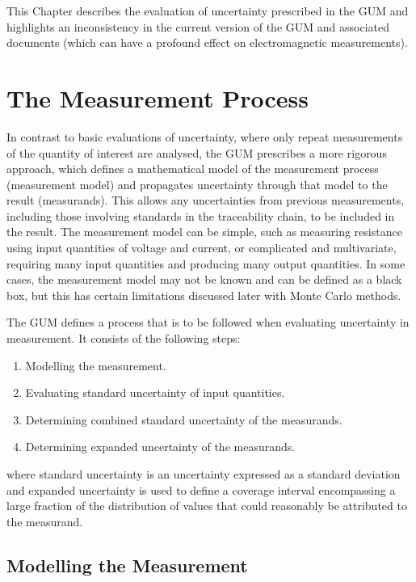 \documentclass[../thesis/thesis.tex]{subfiles}
\begin{document}
\begin{refsection}
This Chapter describes the evaluation of uncertainty prescribed in the GUM and highlights an inconsistency in the current version of the GUM and associated documents (which can have a profound effect on electromagnetic measurements).

\section{The Measurement Process}

In contrast to basic evaluations of uncertainty, where only repeat measurements of the quantity of interest are analysed, the GUM prescribes a more rigorous approach, which defines a mathematical model of the measurement process (measurement model) and propagates uncertainty through that model to the result (measurands). This allows any uncertainties from previous measurements, including those involving standards in the traceability chain, to be included in the result. The measurement model can be simple, such as measuring resistance using input quantities of voltage and current, or complicated and multivariate, requiring many input quantities and producing many output quantities. In some cases, the measurement model may not be known and can be defined as a black box, but this has certain limitations discussed later with Monte Carlo methods.

The GUM defines a process that is to be followed when evaluating uncertainty in measurement. It consists of the following steps:

\begin{enumerate}
	\item Modelling the measurement.
	\item Evaluating standard uncertainty of input quantities.
	\item Determining combined standard uncertainty of the measurands.
	\item Determining expanded uncertainty of the measurands.
\end{enumerate}

where standard uncertainty is an uncertainty expressed as a standard deviation and expanded uncertainty is used to define a coverage interval encompassing a large fraction of the distribution of values that could reasonably be attributed to the measurand.

\subsection{Modelling the Measurement}


\end{refsection}
\end{document}
